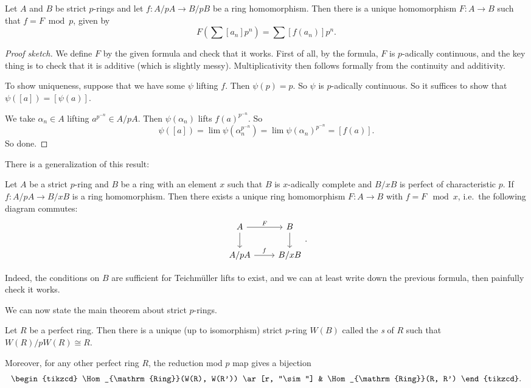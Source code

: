 \documentclass[a4paper]{article}
\begin{document}
\begin{lemma}
  Let $A$ and $B$ be strict $p$-rings and let $f: A/pA \to B/pB$ be a ring homomorphism. Then there is a unique homomorphism $F: A \to B$ such that $f = F \bmod p$, given by
  \[
    F\left(\sum [a_n]p^n\right) = \sum [f(a_n)] p^n.
  \]
\end{lemma}

\begin{proof}[Proof sketch]
  We define $F$ by the given formula and check that it works. First of all, by the formula, $F$ is $p$-adically continuous, and the key thing is to check that it is additive (which is slightly messy). Multiplicativity then follows formally from the continuity and additivity.

  To show uniqueness, suppose that we have some $\psi$ lifting $f$. Then $\psi(p) = p$. So $\psi$ is $p$-adically continuous. So it suffices to show that $\psi([a]) = [\psi(a)]$.

  We take $\alpha_n \in A$ lifting $a^{p^{-n}} \in A/pA$. Then $\psi(\alpha_n)$ lifts $f(a)^{p^{-n}}$. So
  \[
    \psi([a]) = \lim \psi(\alpha_n^{p^{-n}}) = \lim \psi(\alpha_n)^{p^{-n}} = [f(a)].
  \]
  So done.
\end{proof}

There is a generalization of this result:
\begin{prop}
  Let $A$ be a strict $p$-ring and $B$ be a ring with an element $x$ such that $B$ is $x$-adically complete and $B/xB$ is perfect of characteristic $p$. If $f: A/pA \to B/xB$ is a ring homomorphism. Then there exists a unique ring homomorphism $F: A \to B$ with $f = F \mod x$, i.e.\ the following diagram commutes:
  \[
    \begin{tikzcd}
      A \ar[r, "F"] \ar[d] & B \ar[d]\\
      A/pA \ar[r, "f"] & B/xB
    \end{tikzcd}.
  \]
\end{prop}
Indeed, the conditions on $B$ are sufficient for Teichm\"uller lifts to exist, and we can at least write down the previous formula, then painfully check it works.

We can now state the main theorem about strict $p$-rings.

\begin{thm}
  Let $R$ be a perfect ring. Then there is a unique (up to isomorphism) strict $p$-ring $W(B)$ called the \emph{s} of $R$ such that $W(R)/p W(R) \cong R$.

  Moreover, for any other perfect ring $R$, the reduction mod $p$ map gives a bijection
  \[
    \begin{tikzcd}
      \Hom_{\mathrm{Ring}}(W(R), W(R')) \ar[r, "\sim"] & \Hom_{\mathrm{Ring}}(R, R')
    \end{tikzcd}.
  \]
\end{thm}
\end{document}
